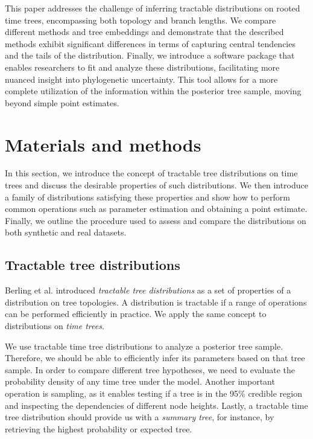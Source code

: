\documentclass[10pt,letterpaper]{article}
\begin{document}
This paper addresses the challenge of inferring tractable distributions on rooted time trees, encompassing both topology and branch lengths. We compare different methods and tree embeddings and demonstrate that the described methods exhibit significant differences in terms of capturing central tendencies and the tails of the distribution. Finally, we introduce a software package that enables researchers to fit and analyze these distributions, facilitating more nuanced insight into phylogenetic uncertainty. This tool allows for a more complete utilization of the information within the posterior tree sample, moving beyond simple point estimates.

\section*{Materials and methods}

In this section, we introduce the concept of tractable tree distributions on time trees and discuss the desirable properties of such distributions. We then introduce a family of distributions satisfying these properties and show how to perform common operations such as parameter estimation and obtaining a point estimate. Finally, we outline the procedure used to assess and compare the distributions on both synthetic and real datasets.

\subsection*{Tractable tree distributions}

Berling et al. \cite{ccd} introduced \emph{tractable tree distributions} as a set of properties of a distribution on tree topologies. A distribution is tractable if a range of operations can be performed efficiently in practice. We apply the same concept to distributions on \emph{time trees}.

We use tractable time tree distributions to analyze a posterior tree sample. Therefore, we should be able to efficiently infer its parameters based on that tree sample. In order to compare different tree hypotheses, we need to evaluate the probability density of any time tree under the model. Another important operation is sampling, as it enables testing if a tree is in the 95\% credible region and inspecting the dependencies of different node heights. Lastly, a tractable time tree distribution should provide us with a \emph{summary tree}, for instance, by retrieving the highest probability or expected tree.
\end{document}

